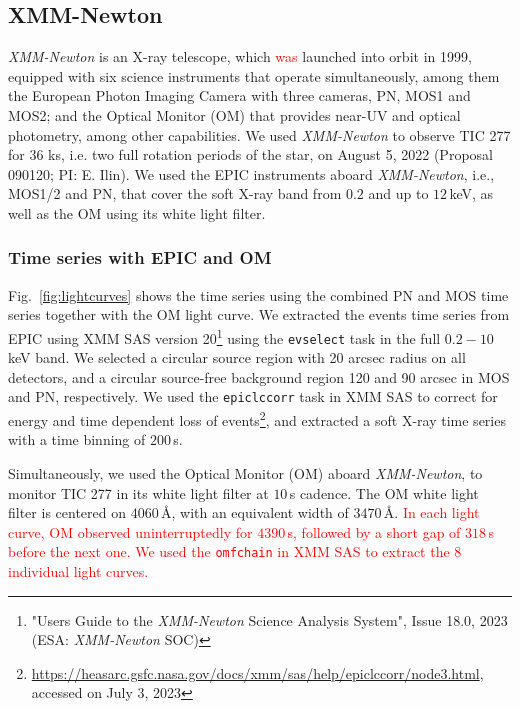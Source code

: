 \documentclass[twocolumn]{aastex631}
\begin{document}
\subsection{XMM-Newton}
\label{sec:obs:xmm}
\textit{XMM-Newton} is an X-ray telescope, which \textcolor{red}{was} launched into orbit in 1999, equipped with six science instruments that operate simultaneously, among them the European Photon Imaging Camera with three cameras, PN, MOS1 and MOS2; and the Optical Monitor (OM) that provides near-UV and optical photometry, among other capabilities.
We used \textit{XMM-Newton} to observe TIC 277 for 36 ks, i.e. two full rotation periods of the star, on August 5, 2022 (Proposal 090120; PI: E. Ilin). We used the EPIC instruments aboard \textit{XMM-Newton}, i.e., MOS1/2 and PN, that cover the soft X-ray band from $0.2$ and up to $12\,$keV, as well as the OM using its white light filter.

\subsubsection{Time series with EPIC and OM}

Fig.~\ref{fig:lightcurves} shows the time series using the combined PN and MOS time series together with the OM light curve. We extracted the events time series from EPIC using XMM SAS version 20\footnote{"Users Guide to the \textit{XMM-Newton} Science Analysis System", Issue 18.0, 2023 (ESA: \textit{XMM-Newton} SOC)} using the \texttt{evselect} task in the full $0.2-10\,$keV band. We selected a circular source region with 20 arcsec radius on all detectors, and a circular source-free background region 120 and 90 arcsec in MOS and PN, respectively. We used the \texttt{epiclccorr} task in XMM SAS to correct for energy and time dependent loss of events\footnote{\url{https://heasarc.gsfc.nasa.gov/docs/xmm/sas/help/epiclccorr/node3.html}, accessed on July 3, 2023}, and extracted a soft X-ray time series with a time binning of $200\,$s.

Simultaneously, we used the Optical Monitor (OM) aboard \textit{XMM-Newton}, to monitor TIC 277 in its white light filter at $10$\,s cadence. The OM white light filter is centered on $4060\,$\AA, with an equivalent width of $3470\,$\AA. \textcolor{red}{In each light curve, OM observed uninterruptedly for $4390\,$s, followed by a short gap of $318\,$s before the next one. We used the \texttt{omfchain} in XMM SAS to extract the 8 individual light curves. }
\end{document}
